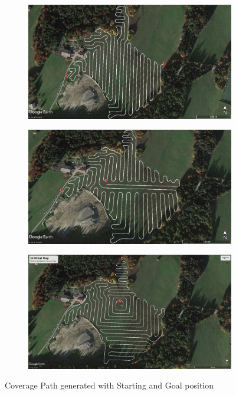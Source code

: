 \begin{figure}[ht]
	\centering
	\begin{subfigure}{0.49\textwidth}
	  \centering
	  \includegraphics[width=0.95\linewidth]{figures/C3/Field3/Field3-CoverageGE-BSpline-noBorder.jpg}
	  \caption{}
	  \label{sfig:F3-regular-start-pos}
	\end{subfigure}
	\begin{subfigure}{0.49\textwidth}
	  \centering
	  \includegraphics[width=0.95\linewidth]{figures/C3/Field3/Field3-CoverageDifferentStartingPosition.jpg}
	  \caption{}
	  \label{sfig:F3-modified-start-pos}
	\end{subfigure}
	\begin{subfigure}{0.49\textwidth}
	  \centering
	  \includegraphics[width=1\linewidth]{figures/C3/Field3/Field3-CoverageDifferentStartingGoalPosition.jpg}
	  \caption{}
	  \label{sfig:F3-modified-start-goal-pos}
	\end{subfigure}
	\caption{Coverage Path generated with Starting and Goal position}
    \label{fig:coverage-start-goal-pos}
\end{figure}
